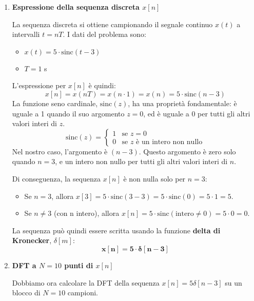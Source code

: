 
\begin{soluzione}{14}
    \begin{enumerate}
        \item \textbf{Espressione della sequenza discreta $x[n]$}
        
        La sequenza discreta si ottiene campionando il segnale continuo $x(t)$ a intervalli $t=nT$. I dati del problema sono:
        \begin{itemize}
            \item $x(t) = 5 \cdot \text{sinc}(t - 3)$
            \item $T = 1$ s
        \end{itemize}
        L'espressione per $x[n]$ è quindi:
        \[
            x[n] = x(n T) = x(n \cdot 1) = x(n) = 5 \cdot \text{sinc}(n - 3)
        \]
        La funzione seno cardinale, $\text{sinc}(z)$, ha una proprietà fondamentale: è uguale a 1 quando il suo argomento $z=0$, ed è uguale a 0 per tutti gli altri valori interi di $z$.
        \[
            \text{sinc}(z) = 
            \begin{cases} 
                1 & \text{se } z = 0 \\
                0 & \text{se } z \text{ è un intero non nullo}
            \end{cases}
        \]
        Nel nostro caso, l'argomento è $(n-3)$. Questo argomento è zero solo quando $n=3$, e un intero non nullo per tutti gli altri valori interi di $n$.
        
        Di conseguenza, la sequenza $x[n]$ è non nulla solo per $n=3$:
        \begin{itemize}
            \item Se $n = 3$, allora $x[3] = 5 \cdot \text{sinc}(3-3) = 5 \cdot \text{sinc}(0) = 5 \cdot 1 = 5$.
            \item Se $n \neq 3$ (con n intero), allora $x[n] = 5 \cdot \text{sinc}(\text{intero} \neq 0) = 5 \cdot 0 = 0$.
        \end{itemize}
        La sequenza può quindi essere scritta usando la funzione \textbf{delta di Kronecker}, $\delta[m]$:
        \[
            \mathbf{x[n] = 5 \cdot \delta[n - 3]}
        \]

        \item \textbf{DFT a $N=10$ punti di $x[n]$}
        
        Dobbiamo ora calcolare la DFT della sequenza $x[n] = 5\delta[n-3]$ su un blocco di $N=10$ campioni.
        

\end{enumerate}
\end{soluzione}
